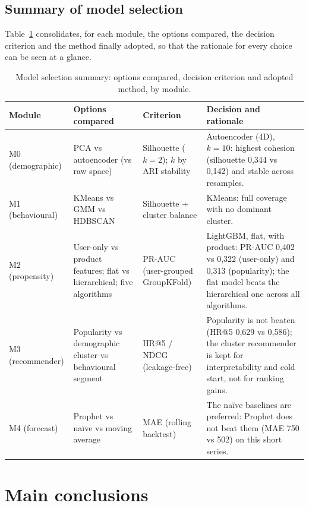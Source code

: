 \subsection*{Summary of model selection}

Table~\ref{tab:model_selection} consolidates, for each module, the options compared, the decision criterion and the method finally adopted, so that the rationale for every choice can be seen at a glance.

\begin{table}[htbp]
\centering
\caption{Model selection summary: options compared, decision criterion and adopted method, by module.}
\label{tab:model_selection}
\small
\begin{tabular}{p{1.5cm}p{4.0cm}p{2.2cm}p{4.7cm}}
\toprule
\textbf{Module} & \textbf{Options compared} & \textbf{Criterion} & \textbf{Decision and rationale} \\
\midrule
M0 (demographic) & PCA vs autoencoder (vs raw space) & Silhouette ($k{=}2$); $k$ by ARI stability & Autoencoder (4D), $k{=}10$: highest cohesion (silhouette 0,344 vs 0,142) and stable across resamples. \\
M1 (behavioural) & KMeans vs GMM vs HDBSCAN & Silhouette + cluster balance & KMeans: full coverage with no dominant cluster. \\
M2 (propensity) & User-only vs product features; flat vs hierarchical; five algorithms & PR-AUC (user-grouped GroupKFold) & LightGBM, flat, with product: PR-AUC 0,402 vs 0,322 (user-only) and 0,313 (popularity); the flat model beats the hierarchical one across all algorithms. \\
M3 (recommender) & Popularity vs demographic cluster vs behavioural segment & HR@5 / NDCG (leakage-free) & Popularity is not beaten (HR@5 0,629 vs 0,586); the cluster recommender is kept for interpretability and cold start, not for ranking gains. \\
M4 (forecast) & Prophet vs naïve vs moving average & MAE (rolling backtest) & The naïve baselines are preferred: Prophet does not beat them (MAE 750 vs 502) on this short series. \\
\bottomrule
\end{tabular}
\end{table}

\section{Main conclusions}


